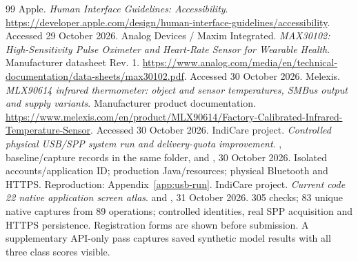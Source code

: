 \begin{thebibliography}{99}
 Apple. \emph{Human Interface Guidelines: Accessibility}. \url{https://developer.apple.com/design/human-interface-guidelines/accessibility}. Accessed 29 October 2026.
 Analog Devices / Maxim Integrated. \emph{MAX30102: High-Sensitivity Pulse Oximeter and Heart-Rate Sensor for Wearable Health}. Manufacturer datasheet Rev. 1. \url{https://www.analog.com/media/en/technical-documentation/data-sheets/max30102.pdf}. Accessed 30 October 2026.
 Melexis. \emph{MLX90614 infrared thermometer: object and sensor temperatures, SMBus output and supply variants}. Manufacturer product documentation. \url{https://www.melexis.com/en/product/MLX90614/Factory-Calibrated-Infrared-Temperature-Sensor}. Accessed 30 October 2026.
 IndiCare project. \emph{Controlled physical USB/SPP system run and delivery-quota improvement}. , baseline/capture records in the same folder,  and , 30 October 2026. Isolated accounts/application ID; production Java/resources; physical Bluetooth and HTTPS. Reproduction: Appendix~\ref{app:usb-run}.
 IndiCare project. \emph{Current code 22 native application screen atlas}.  and , 31 October 2026. 305 checks; 83 unique native captures from 89 operations; controlled identities, real SPP acquisition and HTTPS persistence. Registration forms are shown before submission. A supplementary API-only pass captures saved synthetic model results with all three class scores visible.
\end{thebibliography}
